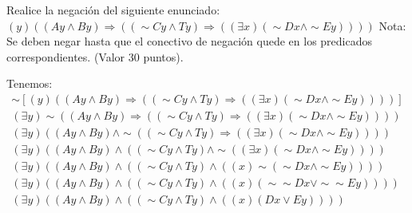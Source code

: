 





\begin{problema}
    Realice la negación del siguiente enunciado:
$(y)((A y \wedge B y) \Longrightarrow((\sim C y \wedge T y) \Longrightarrow((\exists x)(\sim D x \wedge \sim E y))))$
Nota: Se deben negar hasta que el conectivo de negación quede en los predicados correspondientes.
(Valor 30 puntos).
\begin{sol}
    Tenemos:
    \begin{align*}
        \sim \left[(y)((A y \wedge B y) \Longrightarrow((\sim C y \wedge T y) \Longrightarrow((\exists x)(\sim D x \wedge \sim E y)))) \right]\\
        (\exists y)\sim ((A y \wedge B y) \Longrightarrow((\sim C y \wedge T y) \Longrightarrow((\exists x)(\sim D x \wedge \sim E y))))\\
        (\exists y)((A y \wedge B y) \wedge \sim ((\sim C y \wedge T y) \Longrightarrow((\exists x)(\sim D x \wedge \sim E y))))\\
        (\exists y)((A y \wedge B y) \wedge ((\sim C y \wedge T y) \wedge \sim ((\exists x)(\sim D x \wedge \sim E y))))\\
        (\exists y)((A y \wedge B y) \wedge ((\sim C y \wedge T y) \wedge  ((x)\sim(\sim D x \wedge \sim E y))))\\
        (\exists y)((A y \wedge B y) \wedge ((\sim C y \wedge T y) \wedge  ((x) (\sim \sim Dx\vee \sim\sim Ey))))\\
        (\exists y)((A y \wedge B y) \wedge ((\sim C y \wedge T y) \wedge  ((x) (Dx\vee Ey))))\\
    \end{align*}
\end{sol}
\end{problema}

